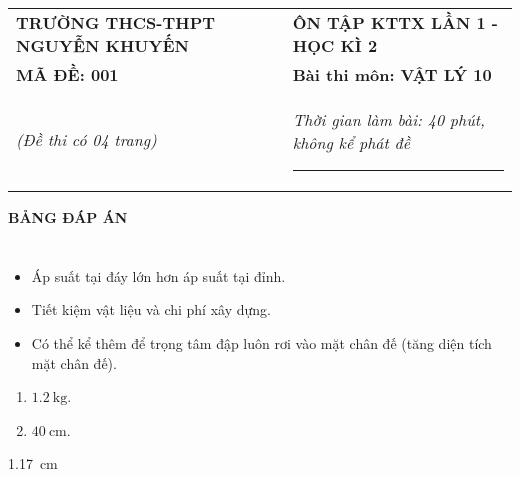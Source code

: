 \begin{center}
	\begin{tabular}{M{9.25cm}M{8.75cm}}
	\textbf{TRƯỜNG THCS-THPT NGUYỄN KHUYẾN}& \textbf{ÔN TẬP KTTX LẦN 1 - HỌC KÌ 2}\\
	\textbf{MÃ ĐỀ: 001}& \textbf{Bài thi môn: VẬT LÝ 10}\\
	\textit{(Đề thi có 04 trang)}& \textit{Thời gian làm bài: 40 phút, không kể phát đề}
	
	\noindent\rule{4cm}{0.8pt} \\
\end{tabular}
\end{center}
\setcounter{section}{0}
\begin{center}
	\textbf{\large BẢNG ĐÁP ÁN}
\end{center}
\section{}
\section{}
\section{}
\setcounter{ex}{0}
\begin{ex}
	\begin{itemize}
		\item Áp suất tại đáy lớn hơn áp suất tại đỉnh.
		\item Tiết kiệm vật liệu và chi phí xây dựng.
		\item Có thể kể thêm để trọng tâm đập luôn rơi vào mặt chân đế (tăng diện tích mặt chân đế).
	\end{itemize}
	\loigiai{}
\end{ex}
\begin{ex}
	\begin{enumerate}[label=\alph*)]
		\item $\SI{1.2}{\kilogram}$.
		\item $\SI{40}{\centi\meter}$.
	\end{enumerate}
	\loigiai{}
\end{ex}
\begin{ex}
	\SI{1.17}{\centi\meter}
	\loigiai{}
\end{ex}